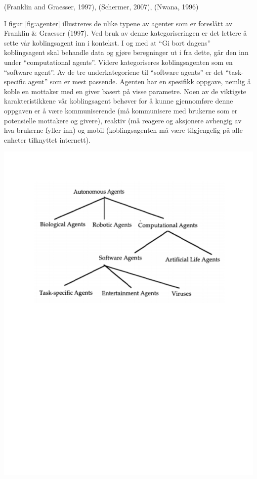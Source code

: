 (Franklin and Graesser, 1997)\citep{agent}, (Schermer, 2007)\citep{schermer}, (Nwana, 1996)\citep{nwana}

I figur \ref{fig:agenter} illustreres de ulike typene av agenter som er foreslått av Franklin \& Graesser (1997)\citep{agent}. Ved bruk av denne kategoriseringen er det lettere å sette vår koblingsagent inn i kontekst. I og med at ``Gi bort dagens'' koblingsagent skal behandle data og gjøre beregninger ut i fra dette, går den inn under ``computational agents''. Videre kategoriseres koblingsagenten som en ``software agent''. Av de tre underkategoriene til ``software agents'' er det ``task-specific agent'' som er mest passende. Agenten har en spesifikk oppgave, nemlig å koble en mottaker med en giver basert på visse parametre. Noen av de viktigste karakteristikkene vår koblingsagent behøver for å kunne gjennomføre denne oppgaven er å være kommuniserende (må kommunisere med brukerne som er potensielle mottakere og givere), reaktiv (må reagere og aksjonere avhengig av hva brukerne fyller inn) og mobil (koblingsagenten må være tilgjengelig på alle enheter tilknyttet internett).


\begin{center}
\includegraphics[clip=true, width=1 \textwidth,
trim=0cm 14cm 0cm 1.5cm]{agenter.pdf}
\label{fig:agenter}
\end{center}

